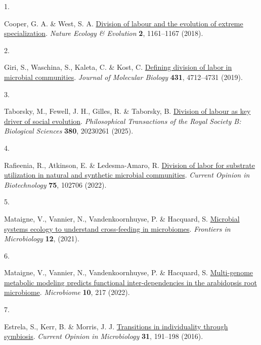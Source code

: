 \documentclass[
  11pt,
  a4paper,
]{report}
\newlength{\cslhangindent}
\newlength{\csllabelwidth}
\newenvironment{CSLReferences}[2] %
 {\begin{list}{}{%
  \setlength{\itemindent}{0pt}
  \setlength{\leftmargin}{0pt}
  \setlength{\parsep}{0pt}
  \ifodd #1
   \setlength{\leftmargin}{\cslhangindent}
   \setlength{\itemindent}{-1\cslhangindent}
  \fi
  \setlength{\itemsep}{#2\baselineskip}}}
 {\end{list}}
\newcommand{\CSLLeftMargin}[1]{\parbox[t]{\csllabelwidth}{\strut#1\strut}}
\newcommand{\CSLRightInline}[1]{\parbox[t]{\linewidth - \csllabelwidth}{\strut#1\strut}}
\begin{document}
\label{refs}
\begin{CSLReferences}{0}{0}
\CSLLeftMargin{1. }%
\CSLRightInline{Cooper, G. A. \& West, S. A.
\href{https://doi.org/10.1038/s41559-018-0564-9}{Division of labour and
the evolution of extreme specialization}. \emph{Nature Ecology \&
Evolution} \textbf{2}, 1161--1167 (2018).}

\CSLLeftMargin{2. }%
\CSLRightInline{Giri, S., Waschina, S., Kaleta, C. \& Kost, C.
\href{https://doi.org/10.1016/j.jmb.2019.06.023}{Defining division of
labor in microbial communities}. \emph{Journal of Molecular Biology}
\textbf{431}, 4712--4731 (2019).}

\CSLLeftMargin{3. }%
\CSLRightInline{Taborsky, M., Fewell, J. H., Gilles, R. \& Taborsky, B.
\href{https://doi.org/10.1098/rstb.2023.0261}{Division of labour as key
driver of social evolution}. \emph{Philosophical Transactions of the
Royal Society B: Biological Sciences} \textbf{380}, 20230261 (2025).}

\CSLLeftMargin{4. }%
\CSLRightInline{Rafieenia, R., Atkinson, E. \& Ledesma-Amaro, R.
\href{https://doi.org/10.1016/j.copbio.2022.102706}{Division of labor
for substrate utilization in natural and synthetic microbial
communities}. \emph{Current Opinion in Biotechnology} \textbf{75},
102706 (2022).}

\CSLLeftMargin{5. }%
\CSLRightInline{Mataigne, V., Vannier, N., Vandenkoornhuyse, P. \&
Hacquard, S. \href{https://doi.org/10.3389/fmicb.2021.780469}{Microbial
systems ecology to understand cross-feeding in microbiomes}.
\emph{Frontiers in Microbiology} \textbf{12}, (2021).}

\CSLLeftMargin{6. }%
\CSLRightInline{Mataigne, V., Vannier, N., Vandenkoornhuyse, P. \&
Hacquard, S.
\href{https://doi.org/10.1186/s40168-022-01383-z}{Multi-genome metabolic
modeling predicts functional inter-dependencies in the arabidopsis root
microbiome}. \emph{Microbiome} \textbf{10}, 217 (2022).}

\CSLLeftMargin{7. }%
\CSLRightInline{Estrela, S., Kerr, B. \& Morris, J. J.
\href{https://doi.org/10.1016/j.mib.2016.04.007}{Transitions in
individuality through symbiosis}. \emph{Current Opinion in Microbiology}
\textbf{31}, 191--198 (2016).}


\end{CSLReferences}
\end{document}
